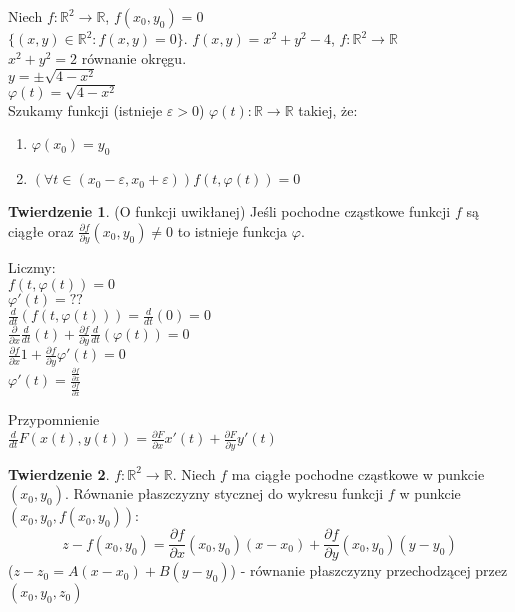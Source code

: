 \documentclass{article}
\theoremstyle{definition}
\theoremstyle{definition}
\newtheorem{tw}{Twierdzenie}[subsection]
\theoremstyle{definition}
\theoremstyle{definition}
\begin{document}
Niech $f: \mathbb{R}^2\rightarrow\mathbb{R}$, $f(x_0,y_0)=0$\\
$\{(x,y)\in\mathbb{R}^2 : f(x,y)=0\}$. $f(x,y)=x^2+y^2-4$, $f:\mathbb{R}^2\rightarrow \mathbb{R}$\\
$x^2+y^2=2$ równanie okręgu.\\
$y=\pm \sqrt{4-x^2}$\\
$\varphi(t)=\sqrt{4-x^2}$\\
Szukamy funkcji (istnieje $\varepsilon > 0$)
$\varphi(t): \mathbb{R}\rightarrow\mathbb{R}$ takiej, że:
\begin{enumerate}
    \item $\varphi(x_0) = y_0$
    \item $\left(\forall t\in(x_0 - \varepsilon, x_0 + \varepsilon)\right) f(t,\varphi(t))=0$
\end{enumerate}

\begin{tw}
    (O funkcji uwikłanej) Jeśli pochodne cząstkowe funkcji $f$ są ciągłe oraz $\frac{\partial f}{\partial y} (x_0,y_0) \neq 0$ to istnieje funkcja $\varphi$.
\end{tw}
Liczmy:\\
$f(t,\varphi(t)) = 0$\\
$\varphi'(t)=??$\\
$\frac{d}{dt} \left(f(t,\varphi(t)) \right) = \frac{d}{dt} (0) = 0$\\
$\frac{\partial}{\partial x} \frac{d}{dt} (t) + \frac{\partial f}{\partial y} \frac{d}{dt} (\varphi(t)) = 0$\\
$\frac{\partial f}{\partial x} 1 + \frac{\partial f}{\partial y} \varphi'(t)= 0$\\
$\varphi'(t) = \frac{\frac{\partial f}{\partial x}}{\frac{\partial f}{\partial x}}$

Przypomnienie\\
$\frac{d}{dt} F(x(t),y(t)) = \frac{\partial F}{\partial x} x'(t) + \frac{\partial F}{\partial y} y'(t)$

\begin{tw}
    $f: \mathbb{R}^2 \rightarrow \mathbb{R}$. Niech $f$ ma ciągłe pochodne cząstkowe w punkcie $(x_0,y_0)$. Równanie płaszczyzny
    stycznej do wykresu funkcji $f$ w punkcie $(x_0,y_0,f(x_0,y_0))$:
    \[z-f(x_0,y_0)=\frac{\partial f}{\partial x} (x_0,y_0) (x-x_0) + \frac{\partial f}{\partial y} (x_0,y_0) (y-y_0)\]
    ($z-z_0=A(x-x_0)+B(y-y_0)$) - równanie płaszczyzny przechodzącej przez $(x_0,y_0,z_0)$
\end{tw}
\end{document}

